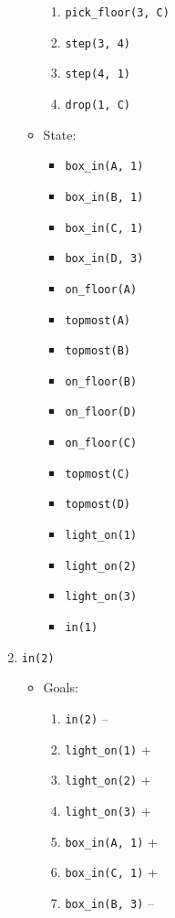 \documentclass[12pt]{article}
\begin{document}
\begin{enumerate}
\begin{itemize}
\begin{enumerate}
          \item \texttt{pick\_floor(3, C)}
          \item \texttt{step(3, 4)}
          \item \texttt{step(4, 1)}
          \item \texttt{drop(1, C)}
        \end{enumerate}
      \item State:
        \begin{itemize}
          \item \texttt{box\_in(A, 1)}
          \item \texttt{box\_in(B, 1)}
          \item \texttt{box\_in(C, 1)}
          \item \texttt{box\_in(D, 3)}
          \item \texttt{on\_floor(A)}
          \item \texttt{topmost(A)}
          \item \texttt{topmost(B)}
          \item \texttt{on\_floor(B)}
          \item \texttt{on\_floor(D)}
          \item \texttt{on\_floor(C)}
          \item \texttt{topmost(C)}
          \item \texttt{topmost(D)}
          \item \texttt{light\_on(1)}
          \item \texttt{light\_on(2)}
          \item \texttt{light\_on(3)}
          \item \texttt{in(1)}
        \end{itemize}
    \end{itemize}
  \item \texttt{in(2)}
    \begin{itemize}
      \item Goals:
        \begin{enumerate}
          \item \texttt{in(2)} --
          \item \texttt{light\_on(1)} +
          \item \texttt{light\_on(2)} +
          \item \texttt{light\_on(3)} +
          \item \texttt{box\_in(A, 1)} +
          \item \texttt{box\_in(C, 1)} +
          \item \texttt{box\_in(B, 3)} --

\end{enumerate}
\end{itemize}
\end{enumerate}
\end{document}
